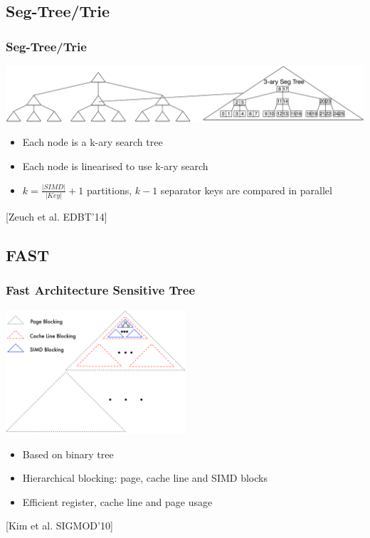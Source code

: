 \documentclass{beamer}
\begin{document}
\subsection{Seg-Tree/Trie}
\begin{frame}
\frametitle{Seg-Tree/Trie}
\begin{center}
\includegraphics[width=1.0\textwidth]{img/SegTree.pdf}
\end{center}
\begin{itemize}[label=\textbullet,leftmargin=1em]
\item Each node is a k-ary search tree
\item Each node is linearised to use k-ary search
\item $k = \frac{\vert SIMD \vert }{\vert Key \vert} + 1$ partitions, $k-1$ separator keys are compared in parallel
\end{itemize}
\vspace*{\fill}
\begin{center}
\tiny [Zeuch et al. EDBT’14]
\end{center}
\end{frame}

\subsection{FAST}
\begin{frame}
\frametitle{Fast Architecture Sensitive Tree}
\begin{center}
\includegraphics[width=0.5\textwidth]{img/fast.pdf}
\end{center}
\begin{itemize}[label=\textbullet,leftmargin=1em]
\item Based on binary tree
\item Hierarchical blocking: page, cache line and SIMD  blocks
\item Efficient register, cache line and page usage
\end{itemize}
\begin{center}
\tiny [Kim et al. SIGMOD’10]
\end{center}
\end{frame}
\end{document}
